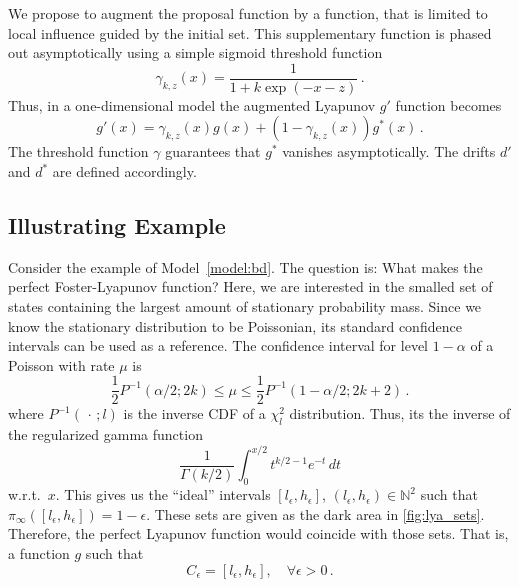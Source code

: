 We propose to augment the proposal function by a function, that is
limited to local influence guided by the initial set.
This supplementary function is phased out asymptotically using a
simple sigmoid threshold function
\begin{equation}\label{eq:threshold}
  \gamma_{k,z}(x) = \frac{1}{1+k\exp(-x - z)}\,.
\end{equation}
Thus, in a one-dimensional model the augmented Lyapunov $g'$ function becomes
\begin{equation}\label{eq:thres_lyapunov}
  g'(x) = \gamma_{k,z}(x) g(x) + (1 - \gamma_{k,z}(x)) g^*(x)\,.
\end{equation}
The threshold function $\gamma$ guarantees that $g^*$ vanishes asymptotically.
The drifts $d'$ and $d^*$ are defined accordingly.

\subsection{Illustrating Example}
Consider the example of Model~\ref{model:bd}.
The question is: What makes the perfect Foster-Lyapunov function?
Here, we are interested in the smalled set of states containing the
largest amount of stationary probability mass.
Since we know the stationary distribution to be Poissonian, its
standard confidence intervals can be used as a reference.
The confidence interval for level $1-\alpha$ of a Poisson with rate $\mu$ is
\[
  \frac{1}{2}P^{-1}(\alpha/2;
  2k)\le\mu\leq\frac{1}{2}P^{-1}(1-\alpha/2;{2k+2})\,.
\]
where $P^{-1}(\,\cdot\,; l)$ is the inverse \ac{CDF} of a
$\chi^2_{l}$ distribution.
Thus, its the inverse of the regularized gamma function
\[
  \frac{1}{\Gamma(k/2)}\int_0^{x/2} t^{k/2 - 1} e^{-t}\,dt
\]
w.r.t.\ $x$.
This gives us the ``ideal'' intervals $[l_{\epsilon},h_{\epsilon}]$,
$(l_{\epsilon},h_{\epsilon})\in\mathbb{N}^2$ such that
$\pi_{\infty}([l_{\epsilon},h_{\epsilon}])=1-\epsilon$.
These sets are given as the dark area in \autoref{fig:lya_sets}.
Therefore, the perfect Lyapunov function would coincide with those
sets. That is,
a function $g$ such that
\[
  C_{\epsilon}
  =
  \left[l_{\epsilon}, h_{\epsilon}\right], \quad \forall\epsilon> 0\,.
\]

